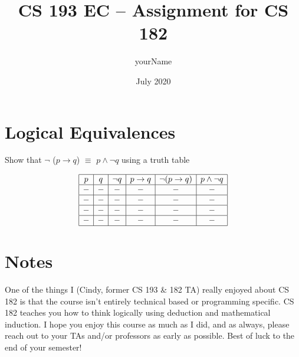 \documentclass{article}
\title{CS 193 EC – Assignment for CS 182}
\author{yourName}
\date{July 2020}
\begin{document}
\maketitle

\section{Logical Equivalences}
\begin{center}
 Show that  $\neg $ ($p \to q$) $\equiv $ $p \land \neg q$ using a truth table
\end{center}

\begin{displaymath}  %
  \begin{array}{|c|c|c|c|c|c|}\hline
    
    p & q & \neg q  & p \to q & \neg (p \to q) & p \land \neg q \\\hline
    - & - & - & - & \mathbf{-} & \mathbf{-} \\\hline
    - & - & - & - & \mathbf{-} & \mathbf{-}  \\\hline
    - & - & - & - & \mathbf{-} & \mathbf{-}  \\\hline
    - & - & - & - & \mathbf{-} & \mathbf{-}  \\\hline

  \end{array}
\end{displaymath}

\section{Notes}
\begin{flushleft}
One of the things I (Cindy, former CS 193 \& 182 TA) really enjoyed about CS 182 is that the course isn't entirely technical based or programming specific. CS 182 teaches you how to think logically using deduction and mathematical induction. I hope you enjoy this course as much as I did, and as always, please reach out to your TAs and/or professors as early as possible. Best of luck to the end of your semester!
\end{flushleft}
\end{document}
